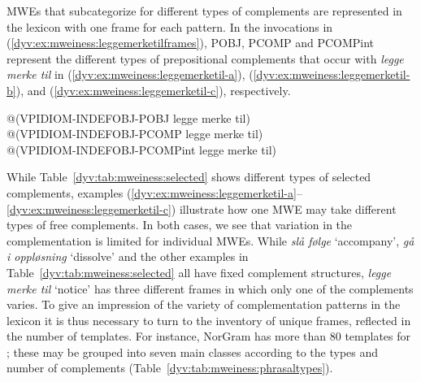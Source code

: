 \documentclass[output=paper]{langsci/langscibook}
\begin{document}
MWEs that subcategorize for different types of complements are represented in the lexicon with one frame for each  pattern.
In the  invocations in (\ref{dyv:ex:mweiness:leggemerketilframes}), POBJ, PCOMP and PCOMPint represent the different types of prepositional complements that occur with \emph{legge merke til} in (\ref{dyv:ex:mweiness:leggemerketil-a}), (\ref{dyv:ex:mweiness:leggemerketil-b}), and (\ref{dyv:ex:mweiness:leggemerketil-c}), respectively.

\ea\label{dyv:ex:mweiness:leggemerketilframes}
\begin{xlist}
\ex \label{dyv:ex:mweiness:leggemerketilframes-a}@(VPIDIOM-INDEFOBJ-POBJ legge merke til) \\ 
\ex \label{dyv:ex:mweiness:leggemerketilframes-b}@(VPIDIOM-INDEFOBJ-PCOMP  legge merke til) \\
\ex \label{dyv:ex:mweiness:leggemerketilframes-c}@(VPIDIOM-INDEFOBJ-PCOMPint legge merke til) \\
\end{xlist}
\z	


While Table~\ref{dyv:tab:mweiness:selected} shows different types of selected complements, examples (\ref{dyv:ex:mweiness:leggemerketil-a}--\ref{dyv:ex:mweiness:leggemerketil-c}) illustrate how one MWE may take different types of free complements.
In both cases, we see that variation in the complementation is limited for individual MWEs.
While \emph{slå følge} `accompany', \emph{gå i oppløsning} `dissolve' and the other examples in Table~\ref{dyv:tab:mweiness:selected} all have fixed complement structures, \emph{legge merke til} `notice' has three different frames in which only one of the complements varies.
To give an impression of the variety of complementation patterns in the lexicon it is thus necessary to turn to the inventory of unique frames, reflected in the number of templates.
For instance, NorGram has more than 80 templates for ; these may be grouped into seven main classes according to the types and number of complements (Table~\ref{dyv:tab:mweiness:phrasaltypes}). %
\end{document}
